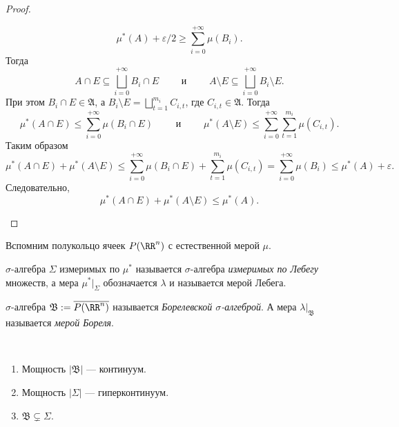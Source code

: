 \documentclass[12pt,a4paper]{article}
\begin{document}
\begin{proof}
\begin{enumerate}
\[                    \mu^*(A) + \varepsilon/2 \geqslant \sum_{i=0}^{+\infty} \mu(B_i).
                \]
                Тогда
                \[
                    A \cap E \subseteq \bigsqcup_{i=0}^{+\infty} B_i \cap E
                    \qquad \text{ и } \qquad
                    A \setminus E \subseteq \bigsqcup_{i=0}^{+\infty} B_i \setminus E.
                \]
                При этом $B_i \cap E \in \mathfrak{A}$, а $B_i \setminus E = \bigsqcup_{t=1}^{m_i} C_{i, t}$, где $C_{i, t} \in \mathfrak{A}$. Тогда
                \[
                    \mu^*(A \cap E) \leqslant \sum_{i=0}^{+\infty} \mu(B_i \cap E)
                    \qquad \text{ и } \qquad
                    \mu^*(A \setminus E) \leqslant \sum_{i=0}^{+\infty} \sum_{t=1}^{m_i} \mu(C_{i, t}).
                \]
                Таким образом
                \[
                    \mu^*(A \cap E) + \mu^*(A \setminus E)
                    \leqslant \sum_{i=0}^{+\infty} \mu(B_i \cap E) + \sum_{t=1}^{m_i} \mu(C_{i, t})
                    = \sum_{i=0}^{+\infty} \mu(B_i)
                    \leqslant \mu^*(A) + \varepsilon.
                \]
                Следовательно,
                \[\mu^*(A \cap E) + \mu^*(A \setminus E) \leqslant \mu^*(A).\]
        \end{enumerate}
    \end{proof}

    \begin{definition}
        Вспомним полукольцо ячеек $P(\RR^n)$ с естественной мерой $\mu$.
        
        $\sigma$-алгебра $\Sigma$ измеримых по $\mu^*$ называется $\sigma$-алгебра \emph{измеримых по Лебегу} множеств, а мера $\mu^*|_\Sigma$ обозначается $\lambda$ и называется мерой Лебега.

        $\sigma$-алгебра $\mathfrak{B} := \overline{P(\RR^n)}$ называется \emph{Борелевской $\sigma$-алгеброй}. А мера $\lambda|_{\mathfrak{B}}$ называется \emph{мерой Бореля}.
    \end{definition}

    \begin{lemma}\ 
        \begin{enumerate}
            \item Мощность $|\mathfrak{B}|$ --- континуум.
            \item Мощность $|\Sigma|$ --- гиперконтинуум.
            \item $\mathfrak{B} \subsetneq \Sigma$.
        \end{enumerate}
    \end{lemma}
\end{document}
